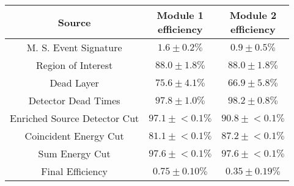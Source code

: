 \begin{tabular}{|c|c|c|}
\hline
  Source & \makecell{Module 1\\efficiency} & \makecell{Module 2\\efficiency} \\
\hline
  M. S. Event Signature & $1.6 \pm 0.2\%$ & $0.9 \pm 0.5\%$ \\
  Region of Interest & $88.0 \pm 1.8\%$ & $88.0 \pm 1.8\%$ \\
  Dead Layer & $75.6 \pm 4.1\%$ & $66.9 \pm 5.8\%$ \\
  Detector Dead Times & $97.8 \pm 1.0\%$ & $98.2 \pm 0.8\%$ \\
  Enriched Source Detector Cut & $97.1 \pm{}<\!0.1\%$ & $90.8 \pm{}<\!0.1\%$ \\
  Coincident Energy Cut & $81.1 \pm{}<\!0.1\%$ & $87.2 \pm{}<\!0.1\%$ \\
  Sum Energy Cut & $97.6 \pm{}<\!0.1\%$ & $97.6 \pm{}<\!0.1\%$ \\
  \hline Final Efficiency & $0.75 \pm 0.10\%$ & $0.35 \pm 0.19\%$ \\
\hline
\end{tabular}
